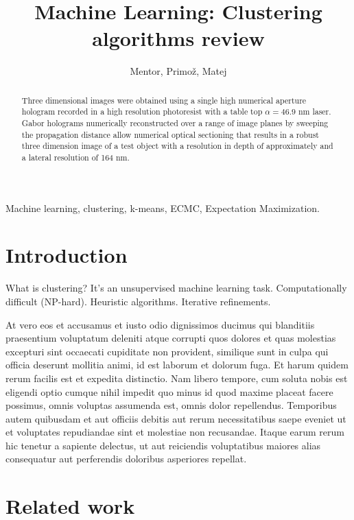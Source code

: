 \documentclass[]{IEEEphot}
\begin{document}
\title{Machine Learning: Clustering algorithms review}
\author{Mentor, Primož, Matej}
\maketitle

\begin{abstract}
Three dimensional images were obtained using a single high numerical aperture hologram recorded in a high resolution photoresist with a table top $\alpha = 46.9$ nm laser. Gabor holograms numerically reconstructed over a range of image planes by sweeping the propagation distance allow numerical optical sectioning that results in a robust three dimension image of a test object with a resolution in depth of approximately and a lateral resolution of 164 nm. 
\end{abstract}

\begin{IEEEkeywords}
Machine learning, clustering, k-means, ECMC, Expectation Maximization.
\end{IEEEkeywords}

\section{Introduction}

What is clustering? It's an unsupervised machine learning task. Computationally difficult
(NP-hard). Heuristic algorithms. Iterative refinements.

At vero eos et accusamus et iusto odio dignissimos ducimus qui blanditiis praesentium voluptatum deleniti atque corrupti quos dolores et quas molestias excepturi sint occaecati cupiditate non provident, similique sunt in culpa qui officia deserunt mollitia animi, id est laborum et dolorum fuga. Et harum quidem rerum facilis est et expedita distinctio. Nam libero tempore, cum soluta nobis est eligendi optio cumque nihil impedit quo minus id quod maxime placeat facere possimus, omnis voluptas assumenda est, omnis dolor repellendus. Temporibus autem quibusdam et aut officiis debitis aut rerum necessitatibus saepe eveniet ut et voluptates repudiandae sint et molestiae non recusandae. Itaque earum rerum hic tenetur a sapiente delectus, ut aut reiciendis voluptatibus maiores alias consequatur aut perferendis doloribus asperiores repellat.

\section{Related work}
\end{document}
